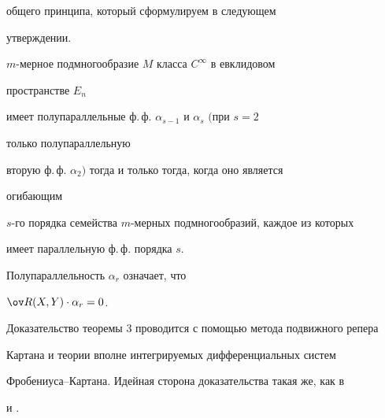 общего принципа, который сформулируем в следующем


утверждении.


 


\begin{thm} 


$m$-мерное подмногообразие $M$ класса $C^\infty$ в евклидовом 


пространстве $E_n$ 


имеет полупараллельные ф.\,ф. $\alpha_{s-1}$ и $\alpha_s$ $($при $s=2$ 


только полупараллельную 


вторую ф.\,ф. $\alpha_2)$ тогда и только тогда, когда оно является 


огибающим 


$s$-го порядка семейства $m$-мерных подмногообразий, каждое из которых 


имеет параллельную ф.\,ф. порядка $s$. 


\end{thm} 


 


Полупараллельность $\alpha_r$ означает, что 


$\ov R(X,Y)\cdot\alpha_r=0$. 





Доказательство теоремы 3 проводится с помощью метода подвижного репера 


Картана и теории вполне интегрируемых дифференциальных систем 


Фробениуса--Картана. Идейная сторона доказательства такая же, как в 


\cite{3} и \cite{9}. 








